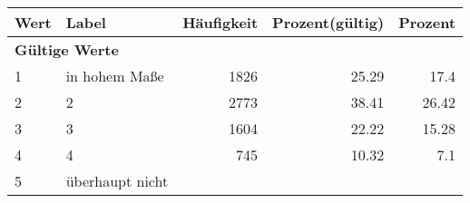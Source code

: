     \begin{longtable}{lXrrr}
     \toprule
     \textbf{Wert} & \textbf{Label} & \textbf{Häufigkeit} & \textbf{Prozent(gültig)} & \textbf{Prozent} \\
     \endhead
     \midrule
     \multicolumn{5}{l}{\textbf{Gültige Werte}}\\

     1 &
     \multicolumn{1}{X}{ in hohem Maße   } &


       \num{1826} &
       \num[round-mode=places,round-precision=2]{25.29} &
         \num[round-mode=places,round-precision=2]{17.4} \\

     2 &
     \multicolumn{1}{X}{ 2   } &


       \num{2773} &
       \num[round-mode=places,round-precision=2]{38.41} &
         \num[round-mode=places,round-precision=2]{26.42} \\

     3 &
     \multicolumn{1}{X}{ 3   } &


       \num{1604} &
       \num[round-mode=places,round-precision=2]{22.22} &
         \num[round-mode=places,round-precision=2]{15.28} \\

     4 &
     \multicolumn{1}{X}{ 4   } &


       \num{745} &
       \num[round-mode=places,round-precision=2]{10.32} &
         \num[round-mode=places,round-precision=2]{7.1} \\

     5 &
     \multicolumn{1}{X}{ überhaupt nicht   } &



\end{longtable}
